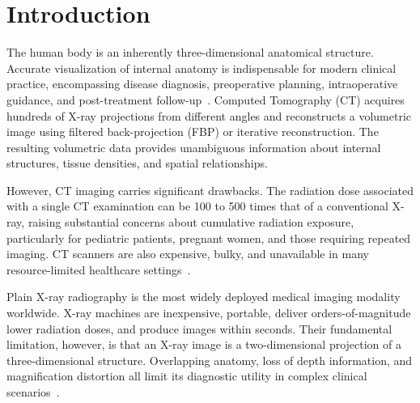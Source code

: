 \documentclass[10pt,twocolumn,a4paper]{article}
\begin{document}
\section{Introduction}
\label{sec:intro}

The human body is an inherently three-dimensional anatomical structure.
Accurate visualization of internal anatomy is indispensable for modern clinical
practice, encompassing disease diagnosis, preoperative planning, intraoperative
guidance, and post-treatment follow-up~\cite{maken2023}. Computed Tomography
(CT) acquires hundreds of X-ray projections from different angles and
reconstructs a volumetric image using filtered back-projection (FBP) or
iterative reconstruction. The resulting volumetric data provides unambiguous
information about internal structures, tissue densities, and spatial
relationships.

However, CT imaging carries significant drawbacks. The radiation dose associated
with a single CT examination can be 100 to 500 times that of a conventional
X-ray, raising substantial concerns about cumulative radiation exposure,
particularly for pediatric patients, pregnant women, and those requiring
repeated imaging. CT scanners are also expensive, bulky, and unavailable in
many resource-limited healthcare settings~\cite{gupta2020}.

Plain X-ray radiography is the most widely deployed medical imaging modality
worldwide. X-ray machines are inexpensive, portable, deliver orders-of-magnitude
lower radiation doses, and produce images within seconds. Their fundamental
limitation, however, is that an X-ray image is a two-dimensional projection of a
three-dimensional structure. Overlapping anatomy, loss of depth information, and
magnification distortion all limit its diagnostic utility in complex clinical
scenarios~\cite{maken2023}.
\end{document}
